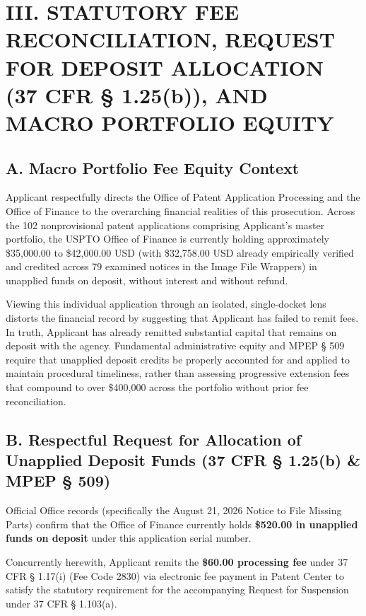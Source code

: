 \documentclass[11pt,letterpaper]{article}
\begin{document}
\section*{III. STATUTORY FEE RECONCILIATION, REQUEST FOR DEPOSIT ALLOCATION (37 CFR \S{} 1.25(b)), AND MACRO PORTFOLIO EQUITY}

\subsection*{A. Macro Portfolio Fee Equity Context}
Applicant respectfully directs the Office of Patent Application Processing and the Office of Finance to the overarching financial realities of this prosecution. Across the 102 nonprovisional patent applications comprising Applicant's master portfolio, the USPTO Office of Finance is currently holding approximately \$35,000.00 to \$42,000.00 USD (with \$32,758.00 USD already empirically verified and credited across 79 examined notices in the Image File Wrappers) in unapplied funds on deposit, without interest and without refund.

Viewing this individual application through an isolated, single-docket lens distorts the financial record by suggesting that Applicant has failed to remit fees. In truth, Applicant has already remitted substantial capital that remains on deposit with the agency. Fundamental administrative equity and MPEP \S{} 509 require that unapplied deposit credits be properly accounted for and applied to maintain procedural timeliness, rather than assessing progressive extension fees that compound to over \$400,000 across the portfolio without prior fee reconciliation.

\subsection*{B. Respectful Request for Allocation of Unapplied Deposit Funds (37 CFR \S{} 1.25(b) \& MPEP \S{} 509)}
Official Office records (specifically the August 21, 2026 Notice to File Missing Parts) confirm that the Office of Finance currently holds \textbf{\$520.00 in unapplied funds on deposit} under this application serial number.

Concurrently herewith, Applicant remits the \textbf{\$60.00 processing fee} under 37 CFR \S{} 1.17(i) (Fee Code 2830) via electronic fee payment in Patent Center to satisfy the statutory requirement for the accompanying Request for Suspension under 37 CFR \S{} 1.103(a).
\end{document}
